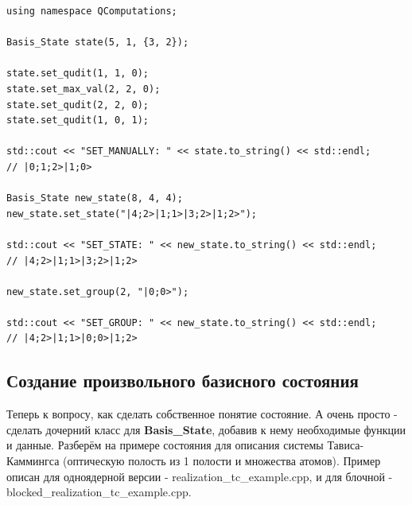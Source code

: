 \documentclass[12pt,fleqn]{article}
\begin{document}
\begin{mdframed}[linecolor=black, topline=true, bottomline=true,
leftline=false, rightline=false]
\begin{verbatim}
using namespace QComputations;

Basis_State state(5, 1, {3, 2});

state.set_qudit(1, 1, 0);
state.set_max_val(2, 2, 0);
state.set_qudit(2, 2, 0);
state.set_qudit(1, 0, 1);

std::cout << "SET_MANUALLY: " << state.to_string() << std::endl;
// |0;1;2>|1;0>

Basis_State new_state(8, 4, 4);
new_state.set_state("|4;2>|1;1>|3;2>|1;2>");

std::cout << "SET_STATE: " << new_state.to_string() << std::endl;
// |4;2>|1;1>|3;2>|1;2>

new_state.set_group(2, "|0;0>");

std::cout << "SET_GROUP: " << new_state.to_string() << std::endl;
// |4;2>|1;1>|0;0>|1;2>
\end{verbatim}
\end{mdframed}


        \subsection{Создание произвольного базисного состояния}

        Теперь к вопросу, как сделать собственное понятие состояние. А очень просто - сделать дочерний класс для \textbf{Basis\_State}, добавив к нему необходимые функции и данные. Разберём на примере 
        состояния для описания системы Тависа-Каммингса (оптическую полость из 1 полости и множества атомов). Пример описан для одноядерной версии - \textsf{realization\_tc\_example.cpp},
         и для блочной - \textsf{blocked\_realization\_tc\_example.cpp}. 
\end{document}
